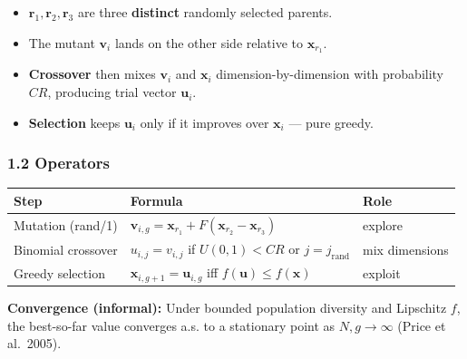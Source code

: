 \documentclass[11pt,a4paper]{article}
\begin{document}
\begin{itemize}

\item
  \(\mathbf{r}_1, \mathbf{r}_2, \mathbf{r}_3\) are three \textbf{distinct} randomly selected parents.
\item
  The mutant \(\mathbf{v}_i\) lands on the other side relative to \(\mathbf{x}_{r_1}\).
\item
  \textbf{Crossover} then mixes \(\mathbf{v}_i\) and \(\mathbf{x}_i\) dimension-by-dimension with probability \(CR\), producing trial vector \(\mathbf{u}_i\).
\item
  \textbf{Selection} keeps \(\mathbf{u}_i\) only if it improves over \(\mathbf{x}_i\) --- pure greedy.
\end{itemize}

\subsubsection{1.2 Operators}\label{operators}

{\def\LTcaptype{none} %
\begin{longtable}[]{@{}
  >{\raggedright\arraybackslash}p{}
  >{\raggedright\arraybackslash}p{}
  >{\raggedright\arraybackslash}p{}@{}}
\toprule\noalign{}
\begin{minipage}[b]{\linewidth}\raggedright
Step
\end{minipage} & \begin{minipage}[b]{\linewidth}\raggedright
Formula
\end{minipage} & \begin{minipage}[b]{\linewidth}\raggedright
Role
\end{minipage} \\
\midrule\noalign{}
\endhead
\bottomrule\noalign{}
\endlastfoot
Mutation (rand/1) & \(\mathbf{v}_{i,g} = \mathbf{x}_{r_1} + F(\mathbf{x}_{r_2}-\mathbf{x}_{r_3})\) & explore \\
Binomial crossover & \(u_{i,j} = v_{i,j}\) if \(U(0,1)<CR\) or \(j=j_\text{rand}\) & mix dimensions \\
Greedy selection & \(\mathbf{x}_{i,g+1} = \mathbf{u}_{i,g}\) iff \(f(\mathbf{u})\le f(\mathbf{x})\) & exploit \\
\end{longtable}
}

\textbf{Convergence (informal):} Under bounded population diversity and Lipschitz \(f\), the best-so-far value converges a.s. to a stationary point as \(N,g\to\infty\) (Price et al.~2005).
\end{document}
